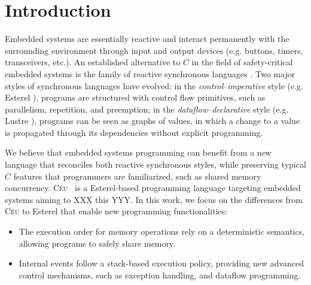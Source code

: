 \documentclass{acm_proc_article-sp}
\newcommand{\CEU}{\textsc{C\'{e}u}\xspace}
\newcommand{\1}{\;}
\newcommand{\2}{\;\;}
\newcommand{\3}{\;\;\;}
\newcommand{\5}{\;\;\;\;\;}
\begin{document}


\section{Introduction}

\begin{comment}
usually designed with safety and real-time requirements under constrained 
hardware platforms.

Software for embedded systems is usually developed in $C$, even though 
concurrent programming systems offering cooperative or preemptive 
multi-threading lack effective safety guarantees, being subject to unbounded 
execution~\cite{wsn.comparison}, race conditions and 
deadlocks~\cite{sync_async.threadsproblems}.
\end{comment}

Embedded systems are essentially reactive and interact permanently with the 
surrounding environment through input and output devices (e.g. buttons, timers, 
transceivers, etc.).
%
An established alternative to $C$ in the field of safety-critical embedded 
systems is the family of reactive synchronous languages \cite{rp.twelve}.
Two major styles of synchronous languages have evolved:
in the \emph{control}--\emph{imperative} style (e.g. Esterel 
\cite{esterel.design}), programs are structured with control flow primitives, 
such as parallelism, repetition, and preemption;
in the \emph{dataflow}--\emph{declarative} style (e.g. Lustre 
\cite{lustre.ieee91}), programs can be seen as graphs of values, in which a 
change to a value is propagated through its dependencies without explicit 
programming.

We believe that embedded systems programming can benefit from a new language 
that reconciles both reactive synchronous styles, while preserving typical $C$ 
features that programmers are familiarized, such as shared memory concurrency.
%
\CEU~\cite{ceu.sensys}
is a Esterel-based programming language targeting embedded systems aiming to 
XXX this YYY.
In this work, we focus on the differences from \CEU to Esterel that enable new 
programming functionalities:
%
\begin{itemize}
\item The execution order for memory operations rely on a deterministic 
semantics, allowing programs to safely share memory.
%
\item Internal events follow a stack-based execution policy, providing new 
advanced control mechanisms, such as exception handling, and dataflow 
programming.
\end{itemize}
\end{document}
